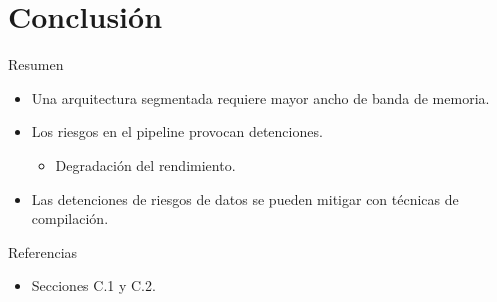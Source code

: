 \section{Conclusión}

\begin{frame}[t]{Resumen}
\begin{itemize}[<+->]
  \item Una arquitectura segmentada requiere mayor ancho de banda de memoria.
  \item Los riesgos en el pipeline provocan detenciones.
    \begin{itemize}
      \item Degradación del rendimiento.
    \end{itemize}
  \item Las detenciones de riesgos de datos se pueden mitigar con técnicas de compilación.
\end{itemize}
\end{frame}


\begin{frame}[t]{Referencias}
\begin{itemize}
  \item \bibhennessy
  Secciones C.1 y C.2.

\end{itemize}
\end{frame}
